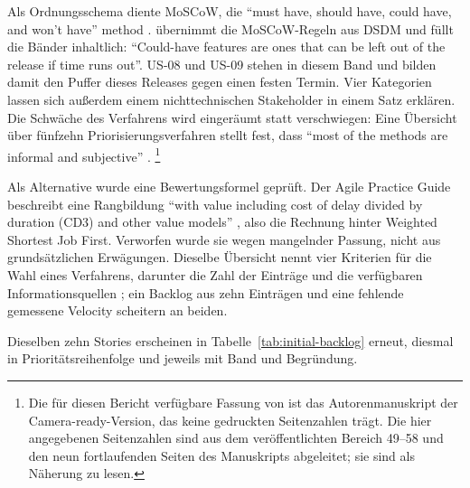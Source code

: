 Als Ordnungsschema diente MoSCoW, die \enquote{must have, should have, could have,
and won't have} method \parencite[PMBOK Guide, Section~4.4.4]{pmbok2021}.
\textcite[p.~98]{cohn2004} übernimmt die MoSCoW-Regeln aus DSDM und füllt die
Bänder inhaltlich: \enquote{Could-have features are ones that can be left out of the
release if time runs out}. US-08 und US-09 stehen in diesem Band und bilden damit
den Puffer dieses Releases gegen einen festen Termin. Vier Kategorien lassen sich
außerdem einem nichttechnischen Stakeholder in einem Satz erklären. Die Schwäche
des Verfahrens wird eingeräumt statt verschwiegen: Eine Übersicht über fünfzehn
Priorisierungsverfahren stellt fest, dass \enquote{most of
the methods are informal and subjective} \parencite[p.~53]{racheva2008}.%
\footnote{Die für diesen Bericht verfügbare Fassung von \textcite{racheva2008}
ist das Autorenmanuskript der Camera-ready-Version, das keine gedruckten
Seitenzahlen trägt. Die hier angegebenen Seitenzahlen sind aus dem
veröffentlichten Bereich 49--58 und den neun fortlaufenden Seiten des
Manuskripts abgeleitet; sie sind als Näherung zu lesen.}

Als Alternative wurde eine Bewertungsformel geprüft. Der Agile Practice Guide
beschreibt eine Rangbildung \enquote{with value including cost of delay divided by duration
(CD3) and other value models} \parencite[p.~59]{pmi2017}, also die Rechnung hinter
Weighted Shortest Job First. Verworfen wurde sie wegen mangelnder Passung, nicht
aus grundsätzlichen Erwägungen. Dieselbe Übersicht
nennt vier Kriterien für die Wahl eines Verfahrens, darunter die Zahl der
Einträge und die verfügbaren Informationsquellen \parencite[p.~56]{racheva2008};
ein Backlog aus zehn Einträgen und eine fehlende gemessene Velocity scheitern an
beiden.

Dieselben zehn Stories erscheinen in Tabelle~\ref{tab:initial-backlog} erneut,
diesmal in Prioritätsreihenfolge und jeweils mit Band und Begründung.


